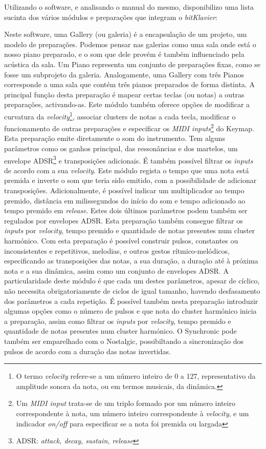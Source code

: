 \documentclass[../main.tex]{subfiles}
\begin{document}
Utilizando o software, e analisando o manual do mesmo\cite{bk2018}, disponibilizo uma lista sucinta dos vários módulos e preparações que integram o \textit{bitKlavier}:
\begin{description}
     Neste software, uma Gallery (ou galeria) é a encapsulação de um projeto, um modelo de preparações. Podemos pensar nas galerias como uma sala onde está o nosso piano preparado, e o som que dele provém é também influenciado pela acústica da sala.
     Um Piano representa um conjunto de preparações fixas, como se fosse um subprojeto da galeria. Analogamente, uma Gallery com três Pianos corresponde a uma sala que contém três pianos preparados de forma distinta.
     A principal função desta preparação é mapear certas teclas (ou notas) a outras preparações, activando-as. Este módulo também oferece opções de modificar a curvatura da \textit{velocity}\footnote{O termo \textit{velocity} refere-se a um número inteiro de 0 a 127, representativo da amplitude sonora da nota, ou em termos musicais, da dinâmica.}, associar clusters de notas a cada tecla, modificar o funcionamento de outras preparações e especificar os \textit{MIDI inputs}\footnote{Um \textit{MIDI input} trata-se de um triplo formado por um número inteiro correspondente à nota, um número inteiro correspondente à \textit{velocity}, e um indicador \textit{on/off} para especificar se a nota foi premida ou largada} do Keymap.
     Esta preparação emite diretamente o som do instrumento. Tem alguns parâmetros como os ganhos principal, das ressonâncias e dos martelos, um envelope ADSR\footnote{ADSR: \textit{attack, decay, sustain, release}} e transposições adicionais. É também possível filtrar os \textit{inputs} de acordo com a sua \textit{velocity}.
     Este módulo regista o tempo que uma nota está premida e inverte o som que teria sido emitido, com a possibilidade de adicionar transposições. Adicionalmente, é possível indicar um multiplicador ao tempo premido, distância em milissegundos do início do som e tempo adicionado ao tempo premido em \textit{release}. Estes dois últimos parâmetros podem também ser regulados por envelopes ADSR. Esta preparação também consegue filtrar os \textit{inputs} por \textit{velocity}, tempo premido e quantidade de notas presentes num cluster harmónico.
     Com esta preparação é possível construir pulsos, constantes ou inconsistentes e repetitivos, melodias, e outros gestos rítmico-melódicos, especificando as transposições das notas, a sua duração, a duração até à próxima nota e a sua dinâmica, assim como um conjunto de envelopes ADSR. A particularidade deste módulo é que cada um destes parâmetros, apesar de cíclico, não necessita obrigatoriamente de ciclos de igual tamanho, havendo desfasamento dos parâmetros a cada repetição. É possível também nesta preparação introduzir algumas opções como o número de pulsos e que nota do cluster harmónico inicia a preparação, assim como filtrar os \textit{inputs} por \textit{velocity}, tempo premido e quantidade de notas presentes num cluster harmónico. O Synchronic pode também ser emparelhado com o Nostalgic, possibiltando a sincronização dos pulsos de acordo com a duração das notas invertidas.

\end{description}
\end{document}
